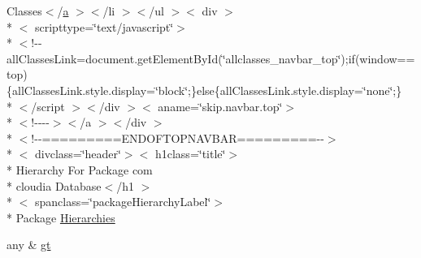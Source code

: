 \begin{DoxyCompactItemize}
\item 
Classes$<$/\hyperlink{style_8css_a5e8981582017bb8b84c21f148345d1f7}{a} $>$$<$/li $>$$<$/ul $>$$<$ div $>$\\*
$<$ scripttype=\char`\"{}text/javascript\char`\"{}$>$\\*
$<$!-\/-\/all\-Classes\-Link=document.\-get\-Element\-By\-Id(\char`\"{}allclasses\-\_\-navbar\-\_\-top\char`\"{});if(window==top)\{all\-Classes\-Link.\-style.\-display=\char`\"{}block\char`\"{};\}else\{all\-Classes\-Link.\-style.\-display=\char`\"{}none\char`\"{};\}\\*
$<$/script $>$$<$/div $>$$<$ aname=\char`\"{}skip.\-navbar.\-top\char`\"{}$>$\\*
$<$!-\/-\/-\/-\/$>$$<$/a $>$$<$/div $>$\\*
$<$!-\/-\/=========E\-N\-D\-O\-F\-T\-O\-P\-N\-A\-V\-B\-A\-R=========-\/-\/$>$\\*
$<$ divclass=\char`\"{}header\char`\"{}$>$$<$ h1class=\char`\"{}title\char`\"{}$>$\\*
 Hierarchy For Package com \\*
cloudia Database$<$/h1 $>$\\*
$<$ spanclass=\char`\"{}package\-Hierarchy\-Label\char`\"{}$>$\\*
 Package \hyperlink{com_2cloudia_2_database_2package-tree_8html_a7fef6f0e61c58495f3c88b858dc5995b}{Hierarchies}
\item 
any \& \hyperlink{com_2cloudia_2_database_2package-tree_8html_a1bb4447113f0bd7bf49e2b3dee2e065d}{gt}
\end{DoxyCompactItemize}


